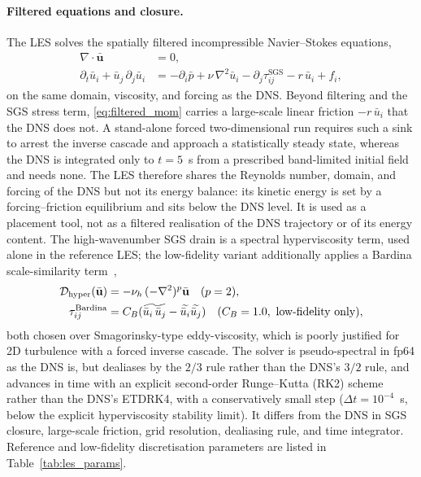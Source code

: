 \paragraph{Filtered equations and closure.}
The LES solves the spatially filtered incompressible Navier--Stokes equations,
\begin{subequations}
\label{eq:filtered_ns}
\begin{align}
    \nabla\!\cdot\!\bar{\mathbf{u}} &= 0, \label{eq:filtered_cont}\\
    \partial_t \bar{u}_i + \bar{u}_j\,\partial_j \bar{u}_i &= -\partial_i \bar{p} + \nu\,\nabla^2 \bar{u}_i - \partial_j \tau_{ij}^{\mathrm{SGS}} - r\,\bar{u}_i + f_i, \label{eq:filtered_mom}
\end{align}
\end{subequations}
on the same domain, viscosity, and forcing as the DNS. Beyond filtering and the SGS stress term, \eqref{eq:filtered_mom} carries a large-scale linear friction $-r\,\bar{u}_i$ that the DNS does not. A stand-alone forced two-dimensional run requires such a sink to arrest the inverse cascade and approach a statistically steady state, whereas the DNS is integrated only to $t=5$~s from a prescribed band-limited initial field and needs none. The LES therefore shares the Reynolds number, domain, and forcing of the DNS but not its energy balance: its kinetic energy is set by a forcing--friction equilibrium and sits below the DNS level. It is used as a placement tool, not as a filtered realisation of the DNS trajectory or of its energy content. The high-wavenumber SGS drain is a spectral hyperviscosity term, used alone in the reference LES; the low-fidelity variant additionally applies a Bardina scale-similarity term~\cite{Bardina1980, Sagaut2006},
\begin{equation}
    \label{eq:bardina_hyperv}
    \begin{aligned}
    \mathcal{D}_{\rm hyper}(\bar{\mathbf{u}}) &= -\nu_h\,(-\nabla^2)^{p}\bar{\mathbf{u}}\quad(p=2), \\
    \tau_{ij}^{\mathrm{Bardina}} &= C_B (\widetilde{\bar{u}_i\,\bar{u}_j} - \widetilde{\bar{u}_i}\widetilde{\bar{u}_j})\quad(C_B = 1.0,\ \text{low-fidelity only}),
    \end{aligned}
\end{equation}
both chosen over Smagorinsky-type eddy-viscosity, which is poorly justified for 2D turbulence with a forced inverse cascade. The solver is pseudo-spectral in fp64 as the DNS is, but dealiases by the $2/3$ rule rather than the DNS's $3/2$ rule, and advances in time with an explicit second-order Runge--Kutta (RK2) scheme rather than the DNS's ETDRK4, with a conservatively small step ($\Delta t = 10^{-4}$~s, below the explicit hyperviscosity stability limit). It differs from the DNS in SGS closure, large-scale friction, grid resolution, dealiasing rule, and time integrator. Reference and low-fidelity discretisation parameters are listed in Table~\ref{tab:les_params}.

